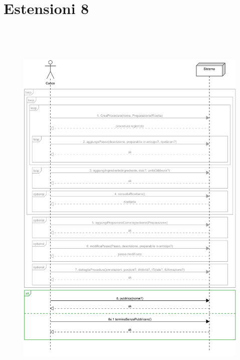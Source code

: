 \section*{Estensioni 8}
\begin{figure}[H]
    \centering\includegraphics[max width=\textwidth, max height=190mm]{../resources/img/GRP/SSD/ext8.png}
\end{figure}
\RaggedRight